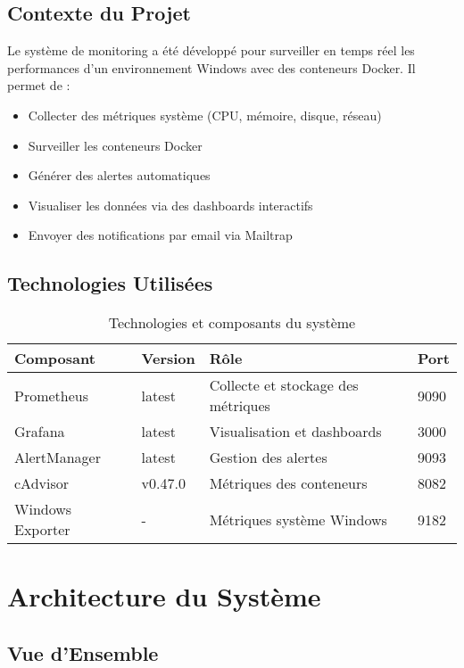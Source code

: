 \documentclass[12pt,a4paper]{report}
\begin{document}
\section{Contexte du Projet}

Le système de monitoring a été développé pour surveiller en temps réel les performances d'un environnement Windows avec des conteneurs Docker. Il permet de :

\begin{itemize}
    \item Collecter des métriques système (CPU, mémoire, disque, réseau)
    \item Surveiller les conteneurs Docker
    \item Générer des alertes automatiques
    \item Visualiser les données via des dashboards interactifs
    \item Envoyer des notifications par email via Mailtrap
\end{itemize}

\section{Technologies Utilisées}

\begin{table}[H]
\centering
\begin{tabular}{|l|l|l|l|}
\hline
\textbf{Composant} & \textbf{Version} & \textbf{Rôle} & \textbf{Port} \\
\hline
Prometheus & latest & Collecte et stockage des métriques & 9090 \\
\hline
Grafana & latest & Visualisation et dashboards & 3000 \\
\hline
AlertManager & latest & Gestion des alertes & 9093 \\
\hline
cAdvisor & v0.47.0 & Métriques des conteneurs & 8082 \\
\hline
Windows Exporter & - & Métriques système Windows & 9182 \\
\hline
\end{tabular}
\caption{Technologies et composants du système}
\label{tab:technologies}
\end{table}

\chapter{Architecture du Système}

\section{Vue d'Ensemble}
\end{document}
